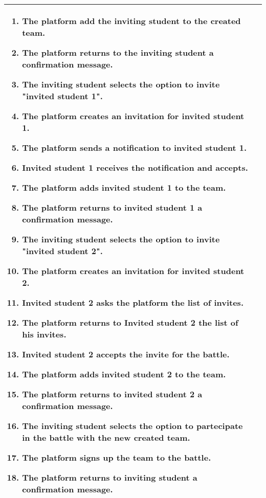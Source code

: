\begin{enumerate}[label=\textbf{UC\arabic*}:,ref=UC\arabic*,leftmargin=1.3cm]
{\begin{table}[H]
\begin{tabular}{|l|p{11.9cm}|}
\begin{enumerate}[label=\arabic*.]
                              \item The platform add the inviting student to the created team.
                              \item The platform returns to the inviting student a confirmation message.
                              \item The inviting student selects the option to invite "invited student 1".
                              \item The platform creates an invitation for invited student 1.
                              \item The platform sends a notification to invited student 1.
                              \item Invited student 1 receives the notification and accepts.
                              \item The platform adds invited student 1 to the team.
                              \item The platform returns to invited student 1 a confirmation message.
                              \item The inviting student selects the option to invite "invited student 2".
                              \item The platform creates an invitation for invited student 2.
                              \item Invited student 2 asks the platform the list of invites.
                              \item The platform returns to Invited student 2 the list of his invites.
                              \item Invited student 2 accepts the invite for the battle.
                              \item The platform adds invited student 2 to the team.
                              \item The platform returns to invited student 2 a confirmation message.
                              \item The inviting student selects the option to partecipate in the battle with the new created team.
                              \item The platform signs up the team to the battle.
                              \item The platform returns to inviting student a confirmation message.
                        \end{enumerate}          \\\hline

\end{tabular}
\end{table}}
\end{enumerate}
